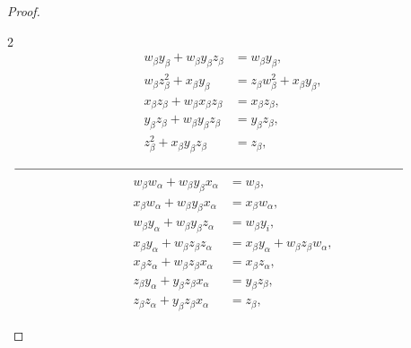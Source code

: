 \documentclass[preprint]{elsarticle}
\begin{document}
\begin{proof}
\begin{tcolorbox}
\begin{multicols}{2}
{\begin{align*}
w_{\beta} y_{\beta} + w_{\beta} y_{\beta} z_{\beta} &= w_{\beta} y_{\beta},\\
w_{\beta} z_{\beta}^2 + x_{\beta} y_{\beta} &= z_{\beta} w_{\beta}^2 + x_{\beta} y_{\beta},\\
x_{\beta} z_{\beta} + w_{\beta} x_{\beta} z_{\beta} &= x_{\beta} z_{\beta},\\
y_{\beta} z_{\beta} + w_{\beta} y_{\beta} z_{\beta} &= y_{\beta} z_{\beta},\\
z_{\beta}^2 + x_{\beta} y_{\beta} z_{\beta} &= z_{\beta},
\end{align*}
\vspace{-0.2cm}}
$\begin{array}{c}
\rule{.9\linewidth}{0.4pt}
\end{array}$
{
\begin{align*}
w_{\beta} w_{\alpha} + w_{\beta} y_{\beta} x_{\alpha} &= w_{\beta},\\
x_{\beta} w_{\alpha} + w_{\beta} y_{\beta} x_{\alpha} &= x_{\beta} w_{\alpha},\\
w_{\beta} y_{\alpha} + w_{\beta} y_{\beta} z_{\alpha} &= w_{\beta} y_i,\\
x_{\beta} y_{\alpha} + w_{\beta} z_{\beta} z_{\alpha} &= x_{\beta} y_{\alpha} + w_{\beta} z_{\beta} w_{\alpha},\\
x_{\beta} z_{\alpha} + w_{\beta} z_{\beta} x_{\alpha} &= x_{\beta} z_{\alpha},\\
z_{\beta} y_{\alpha} + y_{\beta} z_{\beta} x_{\alpha} &= y_{\beta} z_{\beta},\\
z_{\beta} z_{\alpha} + y_{\beta} z_{\beta} x_{\alpha} &= z_{\beta},
\end{align*}
\vspace{-0.2cm}}

\columnbreak


\end{multicols}
\end{tcolorbox}
\end{proof}
\end{document}
